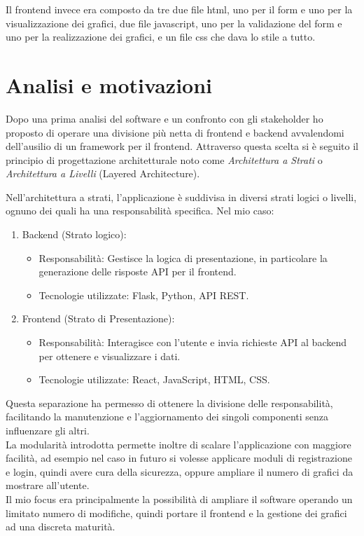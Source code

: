 Il frontend invece era composto da tre due file html, uno per il form e uno per la visualizzazione dei grafici, due file javascript, uno per la validazione del form e uno per la realizzazione dei grafici, e un file css che dava lo stile a tutto. 

\section{Analisi e motivazioni}

Dopo una prima analisi del software e un confronto con gli stakeholder ho proposto di operare una divisione più netta di frontend e backend avvalendomi dell'ausilio di un framework per il frontend. Attraverso questa scelta si è seguito il principio di progettazione architetturale noto come \textit{Architettura a Strati} o \textit{Architettura a Livelli} (Layered Architecture).

Nell'architettura a strati, l'applicazione è suddivisa in diversi strati logici o livelli, ognuno dei quali ha una responsabilità specifica. Nel mio caso:
\begin{enumerate}
\item Backend (Strato logico):
    \begin{itemize}
        \item  Responsabilità: Gestisce la logica di presentazione, in particolare la generazione delle risposte API per il frontend.
        \item  Tecnologie utilizzate: Flask, Python, API REST.
    \end{itemize}
\item Frontend (Strato di Presentazione):
 \begin{itemize}
    \item Responsabilità: Interagisce con l'utente e invia richieste API al backend per ottenere e visualizzare i dati.
    \item Tecnologie utilizzate: React, JavaScript, HTML, CSS.
    \end{itemize}
\end{enumerate}

Questa separazione ha permesso di ottenere la divisione delle responsabilità, facilitando la manutenzione e l'aggiornamento dei singoli componenti senza influenzare gli altri.\\
La modularità introdotta permette inoltre di scalare l'applicazione con maggiore facilità, ad esempio nel caso in futuro si volesse applicare moduli di registrazione e login, quindi avere cura della sicurezza, oppure ampliare il numero di grafici da mostrare all'utente. \\
Il mio focus era principalmente la possibilità di ampliare il software operando un limitato numero di modifiche, quindi portare il frontend e la gestione dei grafici ad una discreta maturità.


